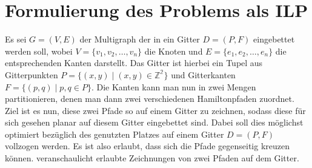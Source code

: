 \documentclass[bachelor, german]{algothesis}
\begin{document}
\section{Formulierung des Problems als ILP}
Es sei $G = (V,E)$ der Multigraph der in ein Gitter $D=(P,F)$ eingebettet werden soll, wobei $V=\{v_1,v_2,\dots, v_n\} $ die Knoten und $E=\{e_1, e_2, \dots, e_n\}$ die entsprechenden Kanten darstellt. Das Gitter ist hierbei ein Tupel aus Gitterpunkten $P=\{(x,y) \mid (x,y) \in \mathbb{Z^2} \}$ und Gitterkanten $F=\{(p,q) \mid p,q \in P\}$. Die Kanten kann man nun in zwei Mengen partitionieren, denen man dann zwei verschiedenen Hamiltonpfaden zuordnet. Ziel ist es nun, diese zwei Pfade so auf einem Gitter zu zeichnen, sodass diese für sich gesehen planar auf diesem Gitter eingebettet sind. Dabei soll dies möglichst optimiert bezüglich des genutzten Platzes auf einem Gitter $D=(P,F)$ vollzogen werden. Es ist also erlaubt, dass sich die Pfade gegenseitig kreuzen können.  veranschaulicht erlaubte Zeichnungen von zwei Pfaden auf dem Gitter. \newline
\end{document}

